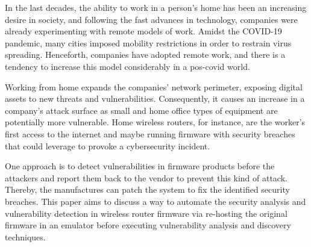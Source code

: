 In the last decades, the ability to work in a person's home has been an increasing desire in society, and following the fast advances in technology, companies were already experimenting with remote models of work. Amidst the COVID-19 pandemic, many cities imposed mobility restrictions in order to restrain virus spreading.  Henceforth, companies have adopted remote work, and there is a tendency to increase this model considerably in a pos-covid world.

Working from home expands the companies' network perimeter, exposing digital assets to new threats and vulnerabilities. Consequently, it causes an increase in a company's attack surface as small and home office types of equipment are potentially more vulnerable. Home wireless routers, for instance, are the worker's first access to the internet and maybe running firmware with security breaches that could leverage to provoke a cybersecurity incident.

One approach is to detect vulnerabilities in firmware products before the attackers and report them back to the vendor to prevent this kind of attack. Thereby, the manufactures can patch the system to fix the identified security breaches. This paper aims to discuss a way to automate the security analysis and vulnerability detection in wireless router firmware via re-hosting the original firmware in an emulator before executing vulnerability analysis and discovery techniques.